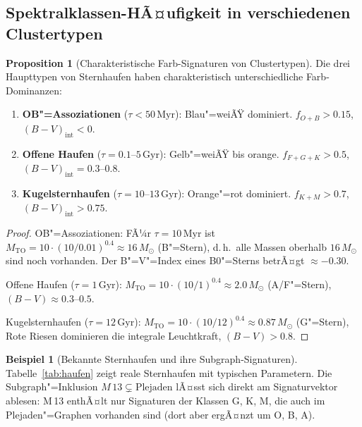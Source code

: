 ﻿\documentclass[a4paper,12pt]{article}
\theoremstyle{definition}
\newtheorem{beispiel}{Beispiel}
\newtheorem{proposition}{Proposition}
\begin{document}
\subsection{Spektralklassen-HÃ¤ufigkeit in verschiedenen Clustertypen}

\begin{proposition}[Charakteristische Farb-Signaturen von Clustertypen]
\label{prop:typen}
    Die drei Haupttypen von Sternhaufen haben charakteristisch
    unterschiedliche Farb-Dominanzen:
    \begin{enumerate}
        \item \textbf{OB"=Assoziationen} ($\tau < 50\,\text{Myr}$):
              Blau"=weiÃŸ dominiert. $f_{O+B} > 0.15$,
              $(B-V)_{\text{int}} < 0$.
        \item \textbf{Offene Haufen} ($\tau = 0.1$--$5\,\text{Gyr}$):
              Gelb"=weiÃŸ bis orange. $f_{F+G+K} > 0.5$,
              $(B-V)_{\text{int}} = 0.3$--$0.8$.
        \item \textbf{Kugelsternhaufen} ($\tau = 10$--$13\,\text{Gyr}$):
              Orange"=rot dominiert. $f_{K+M} > 0.7$,
              $(B-V)_{\text{int}} > 0.75$.
    \end{enumerate}
\end{proposition}

\begin{proof}
    OB"=Assoziationen: FÃ¼r $\tau = 10\,\text{Myr}$ ist
    $M_{\text{TO}} = 10\cdot(10/0.01)^{0.4} \approx 16\,M_\odot$ (B"=Stern),
    d.\,h.\ alle Massen oberhalb $16\,M_\odot$ sind noch vorhanden.
    Der B"=V"=Index eines B0"=Sterns betrÃ¤gt $\approx -0.30$.

    Offene Haufen ($\tau = 1\,\text{Gyr}$):
    $M_{\text{TO}} = 10\cdot(10/1)^{0.4} \approx 2.0\,M_\odot$ (A/F"=Stern),
    $(B-V) \approx 0.3$--$0.5$.

    Kugelsternhaufen ($\tau = 12\,\text{Gyr}$):
    $M_{\text{TO}} = 10\cdot(10/12)^{0.4} \approx 0.87\,M_\odot$ (G"=Stern),
    Rote Riesen dominieren die integrale Leuchtkraft, $(B-V) > 0.8$. \qedhere
\end{proof}

\begin{beispiel}[Bekannte Sternhaufen und ihre Subgraph-Signaturen]
    Tabelle~\ref{tab:haufen} zeigt reale Sternhaufen mit typischen
    Parametern. Die Subgraph"=Inklusion $M\,13 \subsetneq \text{Plejaden}$
    lÃ¤sst sich direkt am Signaturvektor ablesen: M\,13 enthÃ¤lt nur
    Signaturen der Klassen G, K, M, die auch im Plejaden"=Graphen
    vorhanden sind (dort aber ergÃ¤nzt um O, B, A).
\end{beispiel}
\end{document}
